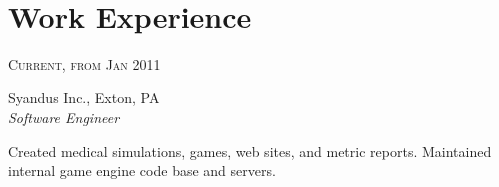 \documentclass[10pt]{article} %
\begin{document}
\color{text1} %


\par{\\ %
	

\begin{minipage}[t]{0.5\textwidth} %
\vspace{0pt} %
	

\section{Work Experience} 


{\raggedleft\textsc{Current, from Jan 2011}\par}

{\raggedright\large Syandus Inc., Exton, PA\\
\textit{Software Engineer}\\[5pt]}

\normalsize{Created medical simulations, games, web sites, and metric reports. Maintained internal game engine code base and servers.}\\


\end{minipage}}
\end{document}
